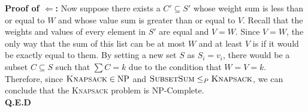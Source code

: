 \textbf{Proof of $\Leftarrow$:}
Now suppose there exists a $C' \subseteq S'$ whose weight sum is less than or equal to $W$ and whose value sum is greater than or equal to $V$. Recall that the weights and values of every element in $S'$ are equal and $V=W$.
Since $V=W$, the only way that the sum of this list can be at most $W$ and at least $V$ is if it would be exactly equal to them.
By setting a new set $S$ as $S_i=v_i$, there would be a subset $C \subseteq S$ such that $\sum C=k$ due to the condition that $W = V = k$. \\

Therefore, since $\textsc{Knapsack} \in \text{NP}$ and $\textsc{SubsetSum} \leq_P \textsc{Knapsack}$, we can conclude that the \textsc{Knapsack} problem is NP-Complete. \\

\textbf{Q.E.D}
